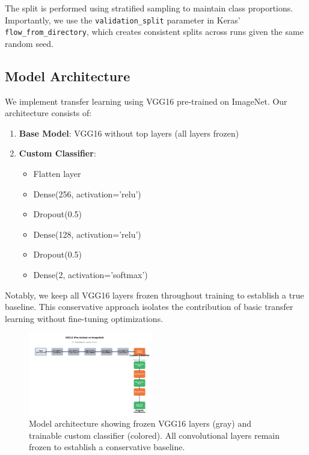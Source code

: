 \documentclass[conference]{IEEEtran}
\begin{document}
The split is performed using stratified sampling to maintain class proportions. Importantly, we use the \texttt{validation\_split} parameter in Keras' \texttt{flow\_from\_directory}, which creates consistent splits across runs given the same random seed.

\subsection{Model Architecture}

We implement transfer learning using VGG16 \cite{simonyan2015very} pre-trained on ImageNet. Our architecture consists of:

\begin{enumerate}
    \item \textbf{Base Model}: VGG16 without top layers (all layers frozen)
    \item \textbf{Custom Classifier}:
    \begin{itemize}
        \item Flatten layer
        \item Dense(256, activation='relu')
        \item Dropout(0.5)
        \item Dense(128, activation='relu')
        \item Dropout(0.5)
        \item Dense(2, activation='softmax')
    \end{itemize}
\end{enumerate}

Notably, we keep all VGG16 layers frozen throughout training to establish a true baseline. This conservative approach isolates the contribution of basic transfer learning without fine-tuning optimizations.

\begin{figure}[H]
\centering
\includegraphics[width=0.48\textwidth]{figures/architecture_diagram.pdf}
\caption{Model architecture showing frozen VGG16 layers (gray) and trainable custom classifier (colored). All convolutional layers remain frozen to establish a conservative baseline.}
\label{fig:architecture}
\end{figure}
\end{document}
